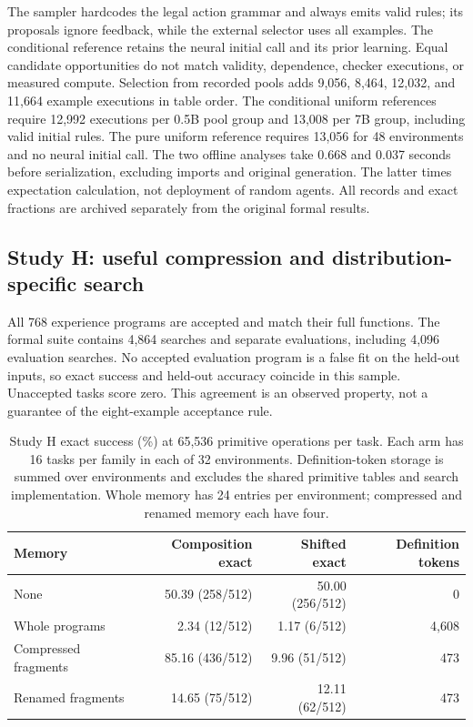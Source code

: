 \documentclass[11pt]{article}
\begin{document}
The sampler hardcodes the legal action grammar and always emits valid rules;
its proposals ignore feedback, while the external selector uses all examples.
The conditional reference retains the neural initial call and its prior
learning. Equal candidate opportunities do not match validity, dependence,
checker executions, or measured compute. Selection from recorded pools adds
9,056, 8,464, 12,032, and 11,664 example executions in table order. The
conditional uniform references require 12,992 executions per 0.5B pool group
and 13,008 per 7B group, including valid initial rules. The pure uniform
reference requires 13,056 for 48 environments and no neural initial call.
The two offline analyses take 0.668 and 0.037 seconds before serialization,
excluding imports and original generation. The latter times expectation
calculation, not deployment of random agents. All records and exact fractions
are archived separately from the original formal results.

\subsection{Study H: useful compression and distribution-specific search}
All 768 experience programs are accepted and match their full functions.
The formal suite contains 4,864 searches and separate evaluations, including
4,096 evaluation searches. No accepted evaluation program is a false fit on
the held-out inputs, so exact success and held-out accuracy coincide in this
sample. Unaccepted tasks score zero. This agreement is an observed property,
not a guarantee of the eight-example acceptance rule.

\begin{table}[ht]
\centering
\begin{tabular}{lrrr}
\toprule
Memory & Composition exact & Shifted exact & Definition tokens \\
\midrule
None & 50.39 (258/512) & 50.00 (256/512) & 0 \\
Whole programs & 2.34 (12/512) & 1.17 (6/512) & 4,608 \\
Compressed fragments & 85.16 (436/512) & 9.96 (51/512) & 473 \\
Renamed fragments & 14.65 (75/512) & 12.11 (62/512) & 473 \\
\bottomrule
\end{tabular}
\caption{Study H exact success (\%) at 65,536 primitive operations per task.
Each arm has 16 tasks per family in each of 32 environments. Definition-token
storage is summed over environments and excludes the shared primitive tables
and search implementation. Whole memory has 24 entries per environment;
compressed and renamed memory each have four.}
\label{tab:h}
\end{table}
\end{document}
